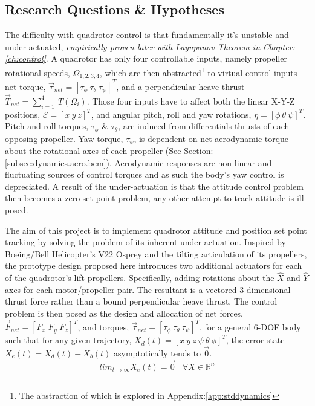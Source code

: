 \subsection{Research Questions \& Hypotheses}
\label{subsec:intro.foreword.hypotheses}
The difficulty with quadrotor control is that fundamentally it's unstable and under-actuated, \emph{empirically proven later with Layupanov Theorem in Chapter:\ref{ch:control}}. A quadrotor has only four controllable inputs, namely propeller rotational speeds, $\Omega_{1,2,3,4}$, which are then abstracted\footnote{The abstraction of which is explored in Appendix:\ref{app:stddynamics}} to virtual control inputs net torque, $\vec{\tau}_{net}=[\tau_{\phi}~\tau_{\theta}~\tau_{\psi}]^T$, and a perpendicular heave thrust $\vec{T}_{net}=\sum_{i=1}^{4}~T(\Omega_i)$. Those four inputs have to affect both the linear X-Y-Z positions, $\mathcal{E}=[x~y~z]^T$, and angular pitch, roll and yaw rotations, $\eta=[\phi~\theta~\psi]^T$. Pitch and roll torques, $\tau_{\phi}$ \& $\tau_{\theta}$, are induced from differentials thrusts of each opposing propeller. Yaw torque, $\tau_{\psi}$, is dependent on net aerodynamic torque about the rotational axes of each propeller (See Section:\ref{subsec:dynamics.aero.bem}). Aerodynamic responses are non-linear and fluctuating sources of control torques and as such the body's yaw control is depreciated. A result of the under-actuation is that the attitude control problem then becomes a zero set point problem, any other attempt to track attitude is ill-posed.
\par
The aim of this project is to implement quadrotor attitude and position set point tracking by solving the problem of its inherent under-actuation. Inspired by Boeing/Bell Helicopter's V22 Osprey and the tilting articulation of its propellers, the prototype design proposed here introduces two additional actuators for each of the quadrotor's lift propellers. Specifically, adding rotations about the $\hat{X}$ and $\hat{Y}$ axes for each motor/propeller pair. The resultant is a vectored 3 dimensional thrust force rather than a bound perpendicular heave thrust. The control problem is then posed as the design and allocation of net forces, $\vec{F}_{net} = [F_x\;F_y\;F_z]^T$, and torques, $\vec{\tau}_{net} = [\tau_{\phi}~\tau_{\theta}~\tau_{\psi}]^T$, for a general 6-DOF body such that for any given trajectory, $X_d(t)=[x~y~z~\psi~\theta~\phi]^T$, the error state $X_e(t) = X_d(t) - X_b(t)$ asymptotically tends to $\vec{0}$.
\begin{equation} \label{eq:trajectoryerror}
lim_{t \rightarrow \infty} X_e(t) = \vec{0}\hspace{10pt}\forall X \in \mathbb{R}^n
\end{equation}
